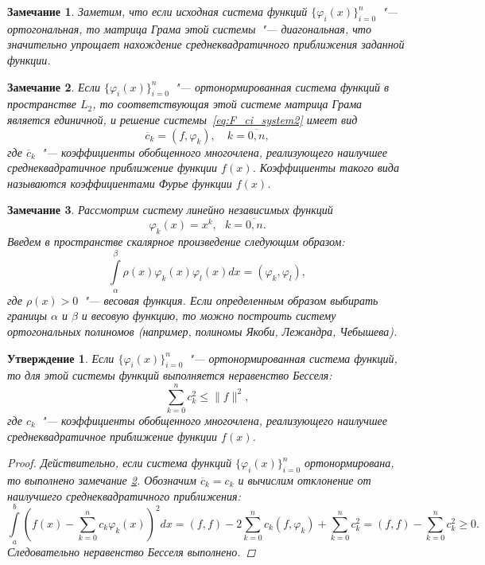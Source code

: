 \documentclass[11pt,a4paper,twoside]{report}
\numberwithin{equation}{section}
\newtheorem*{statement}{Утверждение}
\theoremstyle{definition}
\theoremstyle{plain}
\newtheorem{note}{Замечание}[section]
\begin{document}
%
%
\begin{note}
%
Заметим, что если исходная система функций $\{\varphi_i(x)\}_{i=0}^n$~"---
ортогональная, то матрица Грама этой системы~"--- диагональная, что значительно
упрощает нахождение среднеквадратичного приближения заданной функции.
%
\end{note}
%
%
\begin{note}
\label{note1}
%
    Если $\{\varphi_i(x)\}_{i=0}^n$~"--- ортонормированная система функций
    в пространстве $L_2$, то соответствующая этой системе матрица Грама
    является единичной, и решение системы~\eqref{eq:F_ci_system2} имеет вид
    \begin{equation}
        \label{coeffs_dot_product}
        \overline{c}_k = (f, \varphi_k), \quad k = \overline{0,n},
    \end{equation}
    где $\overline{c}_k$~"--- коэффициенты обобщенного многочлена, реализующего
    наилучшее среднеквадратичное приближение функции $f(x)$. Коэффициенты
    такого вида называются коэффициентами Фурье функции $f(x)$.
%
\end{note}
%
%
\begin{note}
%
Рассмотрим систему линейно независимых функций
$$
    \varphi _k(x) = x^k,~~~k=\overline{0,n}.
$$
Введем в пространстве скалярное произведение следующим образом:
$$
    \int \limits_{\alpha}^{\beta} \rho(x) \varphi_k(x) \varphi_l(x) dx =
    (\varphi_k, \varphi_l),
$$
где $\rho(x) > 0$~"--- весовая функция. Если определенным образом выбирать
границы $\alpha$ и $\beta$ и весовую функцию, то можно построить систему
ортогональных полиномов (например, полиномы Якоби, Лежандра, Чебышева).
%
\end{note}
%
%
\begin{statement}
%
    Если $\{\varphi_i(x)\}_{i=0}^n$~"--- ортонормированная система функций,
    то для этой системы функций выполняется неравенство Бесселя:
    $$
        \sum_{k=0}^n c_k^2 \leqslant \|f\|^2,
    $$
    где $c_k$~"--- коэффициенты обобщенного многочлена, реализующего
    наилучшее среднеквадратичное приближение функции $f(x)$.
    \begin{proof}
    Действительно, если система функций $\{\varphi_i(x)\}_{i=0}^n$ ортонормирована,
    то выполнено замечание \ref{note1}. Обозначим $\overline{c}_k = c_k$ и
    вычислим отклонение от наилучшего среднеквадратичного приближения:
    $$
         \int\limits_a^b (f(x) - \sum_{k=0}^n c_k \varphi_k(x))^2 dx = (f,f)
         - 2\sum_{k=0}^n c_k(f, \varphi_k) + \sum_{k=0}^n c_k^2 = (f,f) -
         \sum_{k=0}^n c_k^2 \geqslant 0.
    $$
    Следовательно неравенство Бесселя выполнено.
    \end{proof}
%
\end{statement}
\end{document}
